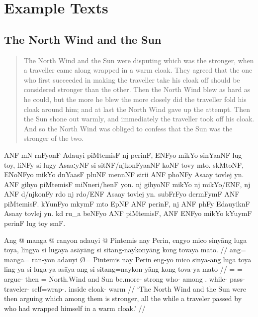 \chapter{Example Texts}

\section{The North Wind and the Sun}
\label{sec:northwind}
\citep[From][]{becker:northwind}

\blockcquote[After Aesop;][39]{ipa2007}{The North Wind and the Sun were
disputing which was the stronger, when a traveller came along wrapped in a warm
cloak. They agreed that the one who first succeeded in making the traveller
take his cloak off should be considered stronger than the other. Then the North
Wind blew as hard as he could, but the more he blew the more closely did the
traveller fold his cloak around him; and at last the North Wind gave up the
attempt. Then the Sun shone out warmly, and immediately the traveller took off
his cloak. And so the North Wind was obliged to confess that the Sun was the
stronger of the two.}

\begin{flushleft}
\noindent\Tagati ANF mN rnFyonF Adauyi piMtemisF nj perinF, ENFyo mikYo
sinYaaNF lug toy, liNFy si lugy AsaaːyNF si sitNF/njkonFyaaNF koNF tovy mto.
skMtoNF, ENoNFyo mikYo dnYaasF pluNF mennNF sirii ANF phoNFy Asaay tovlej yn.
ANF gihyo piM\-temisF miNneri/henF yon. nj gi\-h\-yoNF mikYo nj mikYo/ENF, nj
ANF d/njkonFy rdo nj rdo/ENF Asaay tovlej yn. su\-bFrFyo dermFymF ANF
piMtemisF. kYunFyo mkymF mto EpNF ANF perinF, nj ANF phFy EdauyiknF Asaay
tovlej yn. kd ru\_a beNFyo ANF piMtemisF, ANF ENFyo mikYo kYuymF perinF lug toy
smF.
\end{flushleft}

\medskip

\ex %
\begingl
	\gla Ang @ manga @ ranyon adauyi {} @ Pintemis nay Perin, engyo mico
		sinyāng luga toya, lingya si lugaya asāyāng si sitang-naykonyāng kong
		tovaya mato. //
	\glb ang= manga= ran-yon adauyi Ø= Pintemis nay Perin eng-yo mico sinya-ang
		luga toya ling-ya si luga-ya asāya-ang si sitang=naykon-yāng kong
		tova-ya mato //
	\glc \AgtT{}= \Prog{}= argue-\TplN{} then \Top{}= North.Wind and Sun
		be.more-\TsgN{} strong who-\Aarg{} among \TplN{}.\Loc{}
		while-\Loc{} \Rel{} pass-\TsgM{} traveler-\Aarg{} \Rel{}
		self=wrap-\TsgM{}.\Aarg{} inside cloak-\Loc{} warm //
	\glft `The North Wind and the Sun were then arguing which among them is
		stronger, all the while a traveler passed by who had wrapped himself in
		a warm cloak.' //
\endgl
\xe

